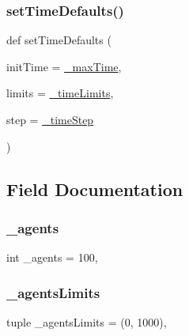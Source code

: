 \subsubsection{\texorpdfstring{set\+Time\+Defaults()}{setTimeDefaults()}}
{\footnotesize\ttfamily def set\+Time\+Defaults (\begin{DoxyParamCaption}\item[{}]{init\+Time = {\ttfamily \hyperlink{class_mu_mo_t_1_1_mu_mo_tdefault_a46ffe9aa10cdab976a57d8ba1d3cd2f6}{\+\_\+max\+Time}},  }\item[{}]{limits = {\ttfamily \hyperlink{class_mu_mo_t_1_1_mu_mo_tdefault_a2208809031da7f126f4416fb64cdb026}{\+\_\+time\+Limits}},  }\item[{}]{step = {\ttfamily \hyperlink{class_mu_mo_t_1_1_mu_mo_tdefault_ad83203bcc6032b30e6f5b57f8982af9e}{\+\_\+time\+Step}} }\end{DoxyParamCaption})\hspace{0.3cm}{\ttfamily [static]}}



\subsection{Field Documentation}
\mbox{\label{class_mu_mo_t_1_1_mu_mo_tdefault_a42f05ec35f2b5b564e064bb19ebd36cf}} 
\subsubsection{\texorpdfstring{\+\_\+agents}{\_agents}}
{\footnotesize\ttfamily int \+\_\+agents = 100\hspace{0.3cm}{\ttfamily [static]}, {\ttfamily [private]}}

\mbox{\label{class_mu_mo_t_1_1_mu_mo_tdefault_a01360abcb6eddb212c38b66852c35e17}} 
\subsubsection{\texorpdfstring{\+\_\+agents\+Limits}{\_agentsLimits}}
{\footnotesize\ttfamily tuple \+\_\+agents\+Limits = (0, 1000)\hspace{0.3cm}{\ttfamily [static]}, {\ttfamily [private]}}

